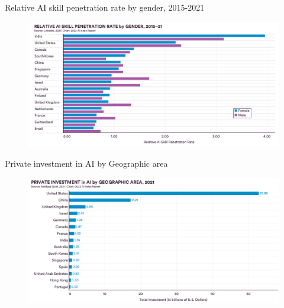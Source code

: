 {

\begin{frame}{
Relative AI skill penetration rate by gender, 2015-2021
}

\begin{figure}
 \centering
 \includegraphics[width=1.0\textwidth]{./figures/progress-of-air-f/outputs/drawing-v00.png}
\end{figure}

\end{frame}
}



{

\begin{frame}{
Private investment in AI by Geographic area
}

\begin{figure}
 \centering
 \includegraphics[width=1.0\textwidth]{./figures/progress-of-air-c/outputs/drawing-v01.png}
\end{figure}

\end{frame}
}



